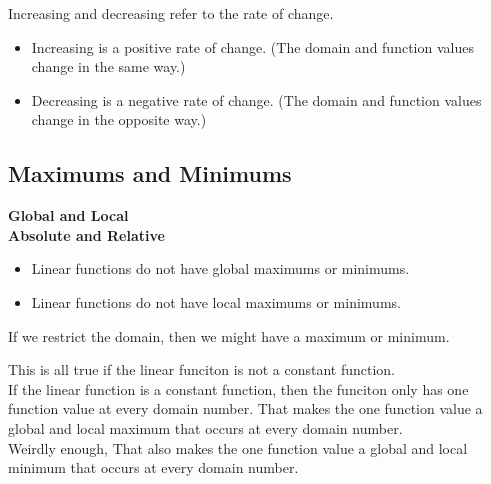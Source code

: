 \documentclass{ximera}
\begin{document}
Increasing and decreasing refer to the rate of change.


\begin{itemize}
\item Increasing is a positive rate of change. (The domain and function values change in the same way.)
\item Decreasing is a negative rate of change. (The domain and function values change in the opposite way.)
\end{itemize}
















\subsection*{Maximums and Minimums}

\textbf{\textcolor{blue!55!black}{Global and Local}} \\
\textbf{\textcolor{blue!55!black}{Absolute and Relative}} \\


\begin{itemize}
     \item Linear functions do not have global maximums or minimums. 
     \item Linear functions do not have local maximums or minimums. 
\end{itemize}


If we restrict the domain, then we might have a maximum or minimum. \\



\begin{warning}

This is all true if the linear funciton is not a constant function. \\


If the linear function is a constant function, then the funciton only has one function value at every domain number.  That makes the one function value a global and local maximum that occurs at every domain number. \\

Weirdly enough, That also makes the one function value a global and local minimum that occurs at every domain number.

\end{warning}
\end{document}
